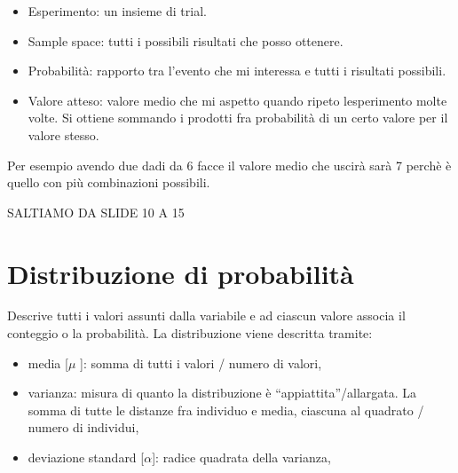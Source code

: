 \documentclass[
]{article}
\providecommand{\tightlist}{%
  \setlength{\itemsep}{0pt}\setlength{\parskip}{0pt}}
\begin{document}
{}

\begin{itemize}
\tightlist
\item
  {Esperimento}{: un insieme di trial.}
\end{itemize}

{}

\begin{itemize}
\tightlist
\item
  {Sample space}{: tutti i possibili risultati che posso ottenere.}
\end{itemize}

{}

\begin{itemize}
\tightlist
\item
  {Probabilità}{: rapporto tra l'evento che mi interessa e tutti i
  risultati possibili.}
\end{itemize}

{}

\begin{itemize}
\tightlist
\item
  {Valore atteso}{: valore medio che mi aspetto quando ripeto
  l\textquotesingle esperimento molte volte. Si ottiene sommando i
  prodotti fra probabilità di un certo valore per il valore stesso.}
\end{itemize}

{Per esempio avendo due dadi da 6 facce il valore medio che uscirà sarà
7 perchè è quello con più combinazioni possibili.}

{}

{SALTIAMO DA SLIDE 10 A 15}

{}

\section{\texorpdfstring{{Distribuzione di
probabilità}}{Distribuzione di probabilità}}\label{h.p19ql9hggae4}

{Descrive tutti i valori assunti dalla variabile e ad ciascun valore
associa il conteggio o la probabilità. La distribuzione viene descritta
tramite:}

\begin{itemize}
\tightlist
\item
  {media {[}$\mu$ {]}: }{somma di tutti i valori / numero di valori}{, }
\item
  {varianza: }{misura di quanto la distribuzione è
  ``appiattita''/allargata. }{La somma di tutte le distanze fra
  individuo e media, ciascuna al quadrato / numero di individui}{,}
\item
  {deviazione standard {[}$\alpha${]}}{: radice quadrata della varianza,}
\end{itemize}
\end{document}
